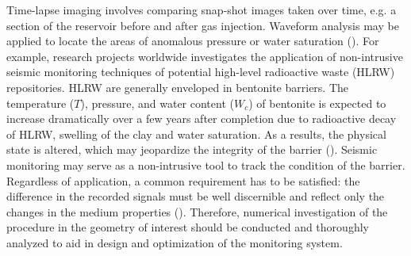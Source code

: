 \documentclass[letterpaper,11pt]{article}
\begin{document}


\quad Time-lapse imaging involves comparing snap-shot images taken over time, e.g. a section of the reservoir before and after gas injection. Waveform analysis may be applied to locate the areas of anomalous pressure or water saturation (\citet{manukyan_seismic_2012}). For example, research projects worldwide investigates the application of non-intrusive seismic monitoring techniques of potential high-level radioactive waste (HLRW) repositories. HLRW are generally enveloped in bentonite barriers. %
The temperature ($T$), pressure, and water content ($W_{c}$) of bentonite is expected to increase dramatically over a few years after completion due to radioactive decay of HLRW, swelling of the clay and water saturation. As a results, the physical state is altered, which may jeopardize the integrity of the barrier (\citet{tisato_laboratory_2013}).%
Seismic monitoring may serve as a non-intrusive tool to track the condition of the barrier.%
Regardless of application, a common requirement has to be satisfied: the difference in the recorded signals must be well discernible and reflect only the changes in the medium properties (\citet{marelli_appraisal_2010}). Therefore, numerical investigation of the procedure in the geometry of interest should be conducted and thoroughly analyzed to aid in design and optimization of the monitoring system.
\end{document}
